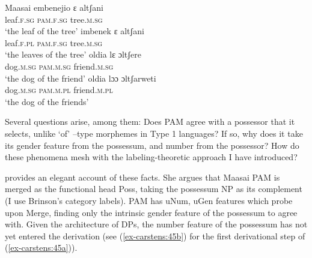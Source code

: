\documentclass[output=paper
,modfonts
,nonflat]{langsci/langscibook}
\begin{document}
\begin{exe}
	\ex  Maasai\label{ex-carstens:44}
	\xlist
	\ex \label{ex-carstens:44a}
	\gll embenejio   ɛ         altʃani\\
	leaf.\textsc{f.sg}      \textsc{pam.f.sg}  tree.\textsc{m.sg}\\
	\glt `the leaf of the tree'  	
	\ex \label{ex-carstens:44b}
	\gll imbenek     ɛ         altʃani\\
	leaf.\textsc{f.pl}      \textsc{pam.f.sg}  tree.\textsc{m.sg}\\
	\glt `the leaves of the tree'
	\ex \label{ex-carstens:44c}
	\gll  oldia     lɛ           ɔltʃere\\
	dog.\textsc{m.sg}  \textsc{pam.m.sg}    friend.\textsc{m.sg}\\
	\glt `the dog of the friend'
	\ex \label{ex-carstens:44d}
	\gll  oldia    lɔɔ         ɔltʃarweti\\
	dog.\textsc{m.sg}  \textsc{pam.m.pl}    friend.\textsc{m.pl}\\
	\glt `the dog of the friends'
	\endxlist
\end{exe}
Several questions arise, among them: Does PAM agree with a possessor that it selects, unlike ‘of’ –type morphemes in Type 1 languages? If so, why does it take its gender feature from the possessum, and number from the possessor? How do these phenomena mesh with the labeling-theoretic approach I have introduced? 

\citet{Brinson2014} provides an elegant account of these facts. She argues that Maasai PAM is merged as the functional head Poss, taking the possessum NP as its complement (I use Brinson's category labels). PAM has uNum, uGen features which probe upon Merge, finding only the intrinsic gender feature of the possessum to agree with. Given the architecture of DPs, the number feature of the possessum has not yet entered the derivation (see (\ref{ex-carstens:45b}) for the first derivational step of (\ref{ex-carstens:45a})).
\end{document}
